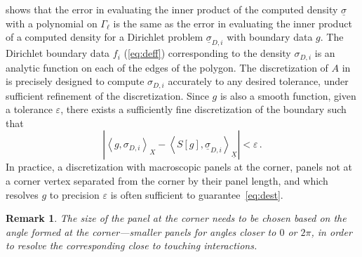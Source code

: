 \documentclass[12pt,times]{elsarticle}
\newcommand{\usigma}{\underline{\sigma}}
\newcommand{\uX}{\underline{X}}
\newtheorem{rem}{Remark}
\begin{document}
{ shows that the error in evaluating the inner product of the computed density $\usigma$ with a polynomial on
$\Gamma_{\ell}$ is the same as the error in evaluating the inner product of a computed density for a Dirichlet problem $\usigma_{D,i}$ with boundary data $g$. 
The Dirichlet boundary data $f_{i}$ (\cref{eq:deff}) corresponding to the density $\sigma_{D,i}$ is an analytic function on each of the edges of the polygon. 
The discretization of $A$ in~\cite{hoskins2019numerical} is precisely designed to compute $\sigma_{D,i}$ accurately to any desired tolerance, under sufficient refinement of the discretization. Since $g$ is also a smooth function, given a tolerance $\varepsilon$, there exists a sufficiently fine discretization of the boundary such that
\begin{equation}
\left| \left< g, \sigma_{D,i} \right>_{X} - \left< S[g], \usigma_{D,i} \right>_{\uX} \right| < \varepsilon \, . \label{eq:dest}
\end{equation}
In practice, a discretization with macroscopic panels at the corner, panels not at a corner vertex separated from the corner by their panel length, and which resolves $g$ to precision $\varepsilon$ is often sufficient to guarantee~\cref{eq:dest}. 
\begin{rem}
The size of the panel at the corner needs to be chosen based on the angle formed at the corner---smaller panels for angles closer to $0$ or $2\pi$, in order to resolve the corresponding close to touching interactions.
\end{rem}
} 
 
 
 
\end{document}
